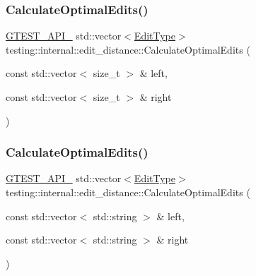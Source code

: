 \subsubsection{\texorpdfstring{CalculateOptimalEdits()}{CalculateOptimalEdits()}\hspace{0.1cm}{\footnotesize\ttfamily [1/2]}}
{\footnotesize\ttfamily \mbox{\hyperlink{gtest-port_8h_aa73be6f0ba4a7456180a94904ce17790}{G\+T\+E\+S\+T\+\_\+\+A\+P\+I\+\_\+}} std\+::vector$<$\mbox{\hyperlink{namespacetesting_1_1internal_1_1edit__distance_ad46aa6da12aec1a3f166310478b53a08}{Edit\+Type}}$>$ testing\+::internal\+::edit\+\_\+distance\+::\+Calculate\+Optimal\+Edits (\begin{DoxyParamCaption}\item[{const std\+::vector$<$ size\+\_\+t $>$ \&}]{left,  }\item[{const std\+::vector$<$ size\+\_\+t $>$ \&}]{right }\end{DoxyParamCaption})}

\mbox{\label{namespacetesting_1_1internal_1_1edit__distance_ad2258c5c811f8f262335f58641b33544}} 
\subsubsection{\texorpdfstring{CalculateOptimalEdits()}{CalculateOptimalEdits()}\hspace{0.1cm}{\footnotesize\ttfamily [2/2]}}
{\footnotesize\ttfamily \mbox{\hyperlink{gtest-port_8h_aa73be6f0ba4a7456180a94904ce17790}{G\+T\+E\+S\+T\+\_\+\+A\+P\+I\+\_\+}} std\+::vector$<$\mbox{\hyperlink{namespacetesting_1_1internal_1_1edit__distance_ad46aa6da12aec1a3f166310478b53a08}{Edit\+Type}}$>$ testing\+::internal\+::edit\+\_\+distance\+::\+Calculate\+Optimal\+Edits (\begin{DoxyParamCaption}\item[{const std\+::vector$<$ std\+::string $>$ \&}]{left,  }\item[{const std\+::vector$<$ std\+::string $>$ \&}]{right }\end{DoxyParamCaption})}

\mbox{\label{namespacetesting_1_1internal_1_1edit__distance_a48cffebc6d3169ad1df7849b5f7fb5ff}} 
